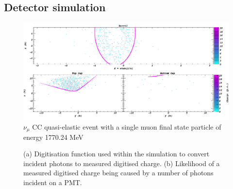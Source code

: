 \subsection{Detector simulation} %
\label{sec:chips_monte_carlo_sim} %

\begin{figure} %
    \includegraphics[width=\textwidth]{diagrams/4-chips/sim_event.png}
    \caption[sim event short]
    {$\nu_{\mu}$ CC quasi-elastic event with a single muon final state particle of energy
        1770.24 MeV}
    \label{fig:sim_event}
\end{figure}

\begin{figure} %
    \centering
    \quad
    \caption[Simulation PMT digitisaion function.]
    {(a) Digitisation function used within the simulation to convert incident photons to measured
        digitised charge. (b) Likelihood of a measured digitised charge being caused by a number
        of photons incident on a PMT.}
    \label{fig:digitisation}
\end{figure}

